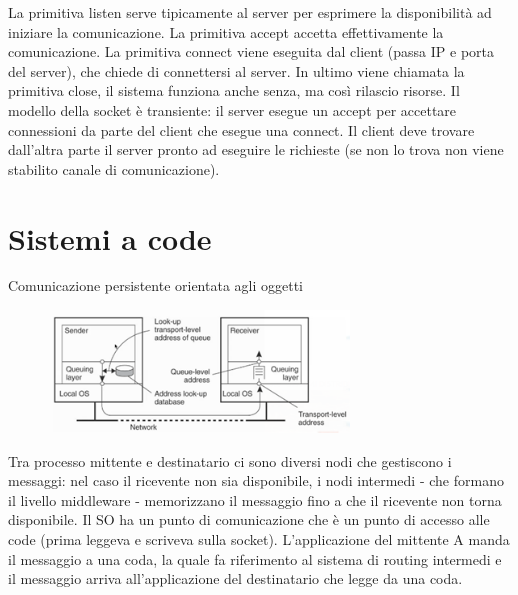 \documentclass[12pt,italian]{report}
\begin{document}
La primitiva listen serve tipicamente al server per esprimere la disponibilità ad iniziare la comunicazione. La primitiva accept accetta effettivamente la comunicazione. La primitiva connect viene eseguita dal client (passa IP e porta del server), che chiede di connettersi al server. In ultimo viene chiamata la primitiva close, il sistema funziona anche senza, ma così rilascio risorse. 
\bigbreak
Il modello della socket è transiente: il server esegue un accept per accettare connessioni da parte del client che esegue una connect. Il client deve trovare dall'altra parte il server pronto ad eseguire le richieste (se non lo trova non viene stabilito canale di comunicazione). 

\section{Sistemi a code}
Comunicazione persistente orientata agli oggetti \\

\begin{figure}[h]
\centering
\includegraphics[width=80mm]{img/code1.png}
\end{figure}
Tra processo mittente e destinatario ci sono diversi nodi che gestiscono i messaggi: nel caso il ricevente non sia disponibile, i nodi intermedi - che formano il livello middleware - memorizzano il messaggio fino a che il ricevente non torna disponibile.
\bigbreak
Il SO ha un punto di comunicazione che è un punto di accesso alle code (prima leggeva e scriveva sulla socket). L'applicazione del mittente A manda il messaggio a una coda, la quale fa riferimento al sistema di routing intermedi e il messaggio arriva all'applicazione del destinatario che legge da una coda. 
\end{document}
